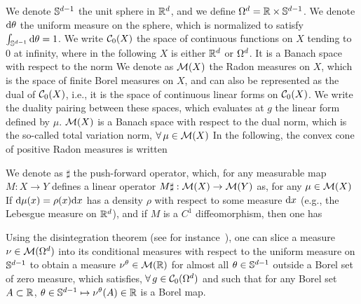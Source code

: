 We denote $\mathbb{S}^{d-1}$ the unit sphere in $\mathbb{R}^d$, and we define $\Omega^d = \mathbb{R} \times \mathbb{S}^{d-1}$. 
We denote $\mathrm{d} \theta$ the uniform measure on the sphere, which is normalized to satisfy $\int_{\mathbb{S}^{d-1}} \mathrm{d}\theta=1$. We write $\mathcal{C}_0(X)$ the space of continuous functions on $X$ tending to 0 at infinity, where in the following $X$ is either $\mathbb{R}^d$ or $\Omega^d$. It is a Banach space with respect to the norm 
We denote as $\mathcal{M}(X)$ the Radon measures on $X$, which is the space of finite Borel measures on $X$, and can also be represented as the dual of $\mathcal{C}_0(X)$, i.e., it is the space of continuous linear forms on $\mathcal{C}_0(X)$. We write 
the duality pairing between these spaces, which evaluates at $g$ the linear form defined by $\mu$. $\mathcal{M}(X)$ is a Banach space with respect to the dual norm, which is the so-called total variation norm, $\forall \, \mu \in \mathcal{M}(X)$
In the following, the convex cone of positive Radon measures is written 

We denote as $\sharp$ the push-forward operator, which, for any measurable map $M : X \rightarrow Y$ defines a linear operator $M\sharp : \mathcal{M}(X) \rightarrow \mathcal{M}(Y)$ as, for any $\mu \in \mathcal{M}(X)$  
If $\mathrm{d}\mu(x) = \rho(x)\mathrm{d} x$ has a density $\rho$ with respect to some measure $\mathrm{d} x$ (e.g., the Lebesgue measure on $\mathbb{R}^d$), and if $M$ is a $C^1$ diffeomorphism, then one has

Using the disintegration theorem (see for instance~\cite{DellacherieBook}), one can slice a measure $\nu \in \mathcal{M}(\Omega^d)$ into its conditional measures with respect to the uniform measure on $\mathbb{S}^{d-1}$ to obtain a measure $\nu^\theta \in \mathcal{M}(\mathbb{R})$ for almost all $\theta \in \mathbb{S}^{d-1}$ outside a Borel set of zero measure, which satisfies, $\forall \, g \in \mathcal{C}_0(\Omega^d)$
and such that for any Borel set $A \subset \mathbb{R}$, $\theta \in \mathbb{S}^{d-1} \mapsto \nu^\theta(A) \in \mathbb{R}$ is a Borel map. 

